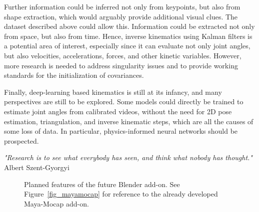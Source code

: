 Further information could be inferred not only from keypoints, but also from shape extraction, which would arguably provide additional visual clues. The dataset described above could allow this. Information could be extracted not only from space, but also from time. Hence, inverse kinematics using Kalman filters is a potential area of interest, especially since it can evaluate not only joint angles, but also velocities, accelerations, forces, and other kinetic variables. However, more research is needed to address singularity issues and to provide working standards for the initialization of covariances.

Finally, deep-learning based kinematics is still at its infancy, and many perspectives are still to be explored. Some models could directly be trained to estimate joint angles from calibrated videos, without the need for 2D pose estimation, triangulation, and inverse kinematic steps, which are all the causes of some loss of data. In particular, physics-informed neural networks should be prospected.



\vspace*{\fill}
\begin{flushright}
\textit{"Research is to see what everybody has seen, and think what nobody has thought."} \\
Albert Szent-Gyorgyi
\end{flushright}


\begin{figure}[hbtp]
      \centering
      \caption{Planned features of the future Blender add-on. See Figure~\ref{fig_mayamocap} for reference to the already developed Maya-Mocap add-on.}
      \label{fig_blendermocap}
\end{figure}




